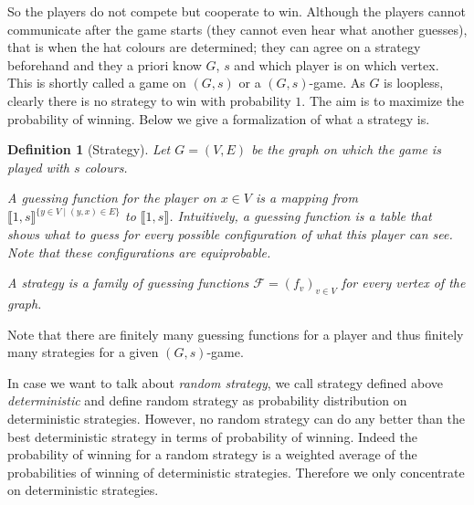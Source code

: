 \documentclass[11pt, a4paper]{kybernetika}
\newtheorem{definition}[theorem]{Definition}
\begin{document}
	So the players do not compete but cooperate to win. Although the players cannot communicate after the game starts (they cannot even hear what another guesses), that is when the hat colours are determined; they can agree on a strategy beforehand and they a priori know $G$, $s$ and which player is on which vertex. This is shortly called a game on $(G,s)$ or a $(G,s)$-game. As $G$ is loopless, clearly there is no strategy to win with probability $1$. The aim is to maximize the probability of winning. Below we give a formalization of what a strategy is.
	\begin{definition}[Strategy]
		Let $G=(V,E)$ be the graph on which the game is played with $s$ colours.
		
		A \emph{guessing function} for the player on $x\in V$ is a mapping from $\llbracket1,s\rrbracket^{\{y\in V\mid (y,x)\in E\}}$ to $\llbracket1,s\rrbracket$. Intuitively, a guessing function is a table that shows what to guess for every possible configuration of what this player can see. Note that these configurations are equiprobable.
		
		A \emph{strategy} is a family of guessing functions $\mathcal{F}=(f_v)_{v\in V}$ for every vertex of the graph.
	\end{definition}
	Note that there are finitely many guessing functions for a player and thus finitely many strategies for a given $(G,s)$-game.
	
	In case we want to talk about \emph{random strategy}, we call strategy defined above \emph{deterministic} and define random strategy as probability distribution on deterministic strategies. However, no random strategy can do any better than the best deterministic strategy in terms of probability of winning. Indeed the probability of winning for a random strategy is a weighted average of the probabilities of winning of deterministic strategies. Therefore we only concentrate on deterministic strategies.
	
\end{document}
